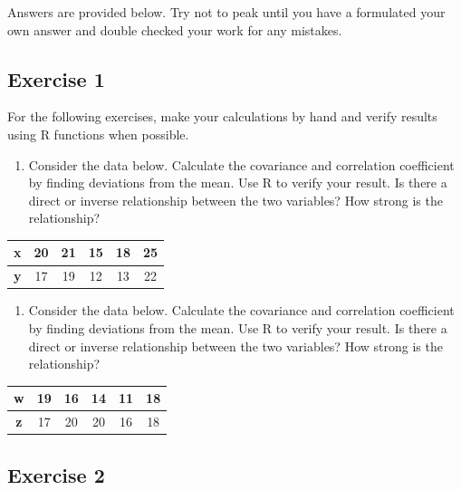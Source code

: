\documentclass[
  letterpaper,
  DIV=11,
  numbers=noendperiod]{scrreprt}
\providecommand{\tightlist}{%
  \setlength{\itemsep}{0pt}\setlength{\parskip}{0pt}}\usepackage{longtable,booktabs,array}
\begin{document}
Answers are provided below. Try not to peak until you have a formulated
your own answer and double checked your work for any mistakes.

\hypertarget{exercise-1-10}{%
\subsection*{Exercise 1}\label{exercise-1-10}}

For the following exercises, make your calculations by hand and verify
results using R functions when possible.

\begin{enumerate}
\def\labelenumi{\arabic{enumi}.}
\tightlist
\item
  Consider the data below. Calculate the covariance and correlation
  coefficient by finding deviations from the mean. Use R to verify your
  result. Is there a direct or inverse relationship between the two
  variables? How strong is the relationship?
\end{enumerate}

\begin{longtable}[]{@{}cccccc@{}}
\toprule()
\textbf{x} & 20 & 21 & 15 & 18 & 25 \\
\midrule()
\endhead
\textbf{y} & 17 & 19 & 12 & 13 & 22 \\
\bottomrule()
\end{longtable}

\begin{enumerate}
\def\labelenumi{\arabic{enumi}.}
\setcounter{enumi}{1}
\tightlist
\item
  Consider the data below. Calculate the covariance and correlation
  coefficient by finding deviations from the mean. Use R to verify your
  result. Is there a direct or inverse relationship between the two
  variables? How strong is the relationship?
\end{enumerate}

\begin{longtable}[]{@{}cccccc@{}}
\toprule()
\textbf{w} & 19 & 16 & 14 & 11 & 18 \\
\midrule()
\endhead
\textbf{z} & 17 & 20 & 20 & 16 & 18 \\
\bottomrule()
\end{longtable}

\hypertarget{exercise-2-10}{%
\subsection*{Exercise 2}\label{exercise-2-10}}
\end{document}
